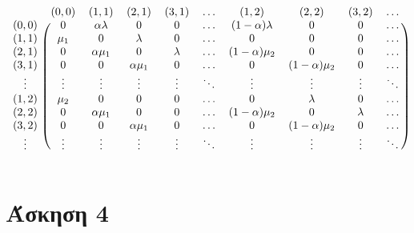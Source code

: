\documentclass[a4paper,11pt]{article}
\begin{document}
\[
	\begin{blockarray}{cccccccccc}
		& (0,0) & (1,1) & (2,1) & (3,1) & \dots & (1,2) & (2,2) & (3,2) & \dots \\
		\begin{block}{c(ccccccccc)}
			(0,0) & 0 & \alpha \lambda & 0 & 0 & \dots & (1-\alpha) \lambda & 0 & 0 & \dots \\
			(1,1) & \mu_1 & 0 & \lambda & 0 & \dots & 0 & 0 & 0 & \dots \\
			(2,1) & 0 & \alpha \mu_1 & 0 & \lambda & \dots & (1-\alpha) \mu_2 & 0 & 0 & \dots \\
			(3,1) & 0 & 0 & \alpha \mu_1 & 0 & \dots & 0 & (1-\alpha) \mu_2 & 0 & \dots \\
			\vdots & \vdots & \vdots & \vdots & \vdots & \ddots & \vdots & \vdots & \vdots & \ddots \\
			(1,2) & \mu_2 & 0 & 0 & 0 & \dots & 0 & \lambda & 0 & \dots \\
			(2,2) & 0 & \alpha \mu_1 & 0 & 0 & \dots & (1-\alpha) \mu_2 & 0 & \lambda & \dots \\
			(3,2) & 0 & 0 & \alpha \mu_1 & 0 & \dots & 0 & (1-\alpha) \mu_2 & 0 & \dots \\
			\vdots & \vdots & \vdots & \vdots & \vdots & \ddots & \vdots & \vdots & \vdots & \ddots \\
		\end{block}
	\end{blockarray}
\]


\section*{Άσκηση 4}
\end{document}
